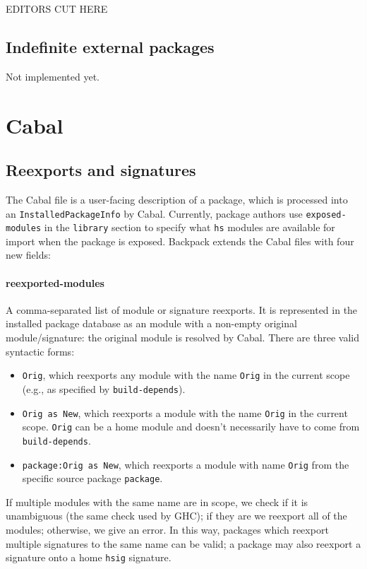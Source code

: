 \documentclass{article}
\newcommand{\Red}[1]{{\color{red} #1}}
\begin{document}
\Red{EDITORS CUT HERE}

\subsection{Indefinite external packages}

\Red{Not implemented yet.}

\section{Cabal}

\subsection{Reexports and signatures}

The Cabal file is a user-facing description of a package, which is
processed into an \texttt{InstalledPackageInfo} by Cabal.  Currently,
package authors use \texttt{exposed-modules} in the \texttt{library}
section to specify what \texttt{hs} modules are available for import
when the package is exposed.  Backpack extends the Cabal files with four
new fields:

\paragraph{reexported-modules}  A comma-separated list of module or
signature reexports.  It is represented in the installed package
database as an module with a non-empty original module/signature: the
original module is resolved by Cabal.  There are three valid syntactic
forms:

\begin{itemize}
    \item \texttt{Orig}, which reexports any module with the
    name \texttt{Orig} in the current scope (e.g.,
    as specified by \texttt{build-depends}).

    \item \texttt{Orig as New}, which reexports a module with
    the name \texttt{Orig} in the current scope.  \texttt{Orig}
    can be a home module and doesn't necessarily have to come
    from \texttt{build-depends}.

    \item \texttt{package:Orig as New}, which reexports a module
    with name \texttt{Orig} from the specific source package \texttt{package}.
\end{itemize}

If multiple modules with the same name are in scope, we check
if it is unambiguous (the same check used by GHC); if they are
we reexport all of the modules; otherwise, we give an error.
In this way, packages which reexport multiple signatures to the
same name can be valid; a package may also reexport a signature
onto a home \texttt{hsig} signature.
\end{document}
